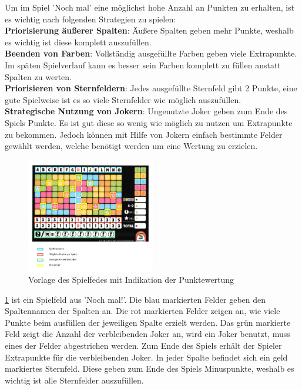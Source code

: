 Um im Spiel 'Noch mal' eine möglichst hohe Anzahl an Punkten zu erhalten, ist es wichtig nach folgenden Strategien zu spielen: \\
\textbf{Priorisierung äußerer Spalten}: Äußere Spalten geben mehr Punkte, weshalb es wichtig ist diese komplett auszufüllen. \\
\textbf{Beenden von Farben}: Vollständig ausgefüllte Farben geben viele Extrapunkte. Im späten Spielverlauf kann es besser sein Farben komplett zu füllen anstatt Spalten zu werten. \\
 \textbf{Priorisieren von Sternfeldern}: Jedes ausgefüllte Sternfeld gibt 2 Punkte, eine gute Spielweise ist es so viele Sternfelder wie möglich auszufüllen. \\
\textbf{Strategische Nutzung von Jokern}: Ungenutzte Joker geben zum Ende des Spiels Punkte. Es ist gut diese so wenig wie möglich zu nutzen um Extrapunkte zu bekommen. Jedoch können mit Hilfe von Jokern einfach bestimmte Felder gewählt werden, welche benötigt werden um eine Wertung zu erzielen.

\newpage

\begin{figure}[!h]
	\centering
	\includegraphics[width=0.5\textwidth]{Bilder/Abbildung2.png}
	\caption{Vorlage des Spielfedes mit Indikation der Punktewertung}
	\label{fig:Vorlage}
\end{figure}

\ref{fig:Vorlage} ist ein Spielfeld aus 'Noch mal!'. Die blau markierten Felder geben den Spaltennamen der Spalten an. Die rot markierten Felder zeigen an, wie viele Punkte beim ausfüllen der jeweiligen Spalte erzielt werden. Das grün markierte Feld zeigt die Anzahl der verbleibenden Joker an, wird ein Joker benutzt, muss eines der Felder abgestrichen werden. Zum Ende des Spiels erhält der Spieler Extrapunkte für die verbleibenden Joker. In jeder Spalte befindet sich ein geld markiertes Sternfeld. Diese geben zum Ende des Spiels Minuspunkte, weshalb es wichtig ist alle Sternfelder auszufüllen.



